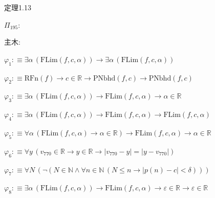 \begin{fullproof}{定理1.13}
\begin{ptree}
\end{ptree}
\noindent$\Pi_{195}$:
\begin{ptree}
\noLine
{}
\end{ptree}
\noindent 主木:
\begin{ptree}
\noLine
{}
\noLine
{}
\end{ptree}
\begin{abbrevlist}
\item $\varphi_{1} :\equiv \exists \alpha\,(\mathrm{FLim}(f,c,\alpha)) \to \exists \alpha\,(\mathrm{FLim}(f,c,\alpha))$
\item $\varphi_{2} :\equiv \mathrm{RFn}(f) \to c \in \mathbb{R} \to \mathrm{PNbhd}(f,c) \to \mathrm{PNbhd}(f,c)$
\item $\varphi_{3} :\equiv \exists \alpha\,(\mathrm{FLim}(f,c,\alpha)) \to \mathrm{FLim}(f,c,\alpha) \to \alpha \in \mathbb{R}$
\item $\varphi_{4} :\equiv \exists \alpha\,(\mathrm{FLim}(f,c,\alpha)) \to \mathrm{FLim}(f,c,\alpha) \to \mathrm{FLim}(f,c,\alpha)$
\item $\varphi_{5} :\equiv \forall \alpha\,(\mathrm{FLim}(f,c,\alpha) \to \alpha \in \mathbb{R}) \to \mathrm{FLim}(f,c,\alpha) \to \alpha \in \mathbb{R}$
\item $\varphi_{6} :\equiv \forall y\,(v_{770} \in \mathbb{R} \to y \in \mathbb{R} \to \lvert v_{770} - y \rvert = \lvert y - v_{770} \rvert)$
\item $\varphi_{7} :\equiv \forall N\,(\neg (N \in \mathbb{N} \land \forall n \in \mathbb{N}\,(N \leq n \to \lvert p(n) - c \rvert < \delta)))$
\item $\varphi_{8} :\equiv \exists \alpha\,(\mathrm{FLim}(f,c,\alpha)) \to \mathrm{FLim}(f,c,\alpha) \to \varepsilon \in \mathbb{R} \to \varepsilon \in \mathbb{R}$

\end{abbrevlist}
\end{fullproof}
